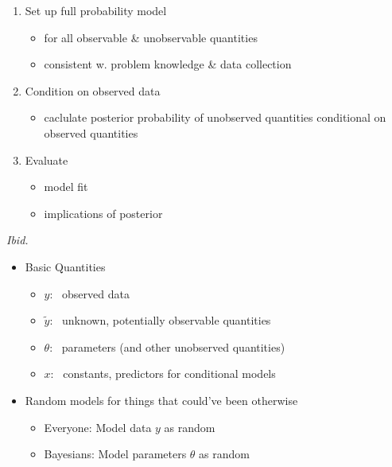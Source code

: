 \documentclass[10pt]{report}
\newcommand{\sld}[1]{\newpage{\noindent\LARGE \ \ \
    \textcolor{MidnightBlue}{\bfseries #1}}\vspace*{4pt}}
\begin{document}
\sld{Bayesian Mechanics}
% 
\begin{enumerate}
\item Set up full probability model 
  \vspace*{-4pt}
  \begin{itemize}
  \item for all observable \& unobservable quantities
  \item consistent w. problem knowledge \& data collection
  \end{itemize}
\item Condition on observed data
  \vspace*{-4pt}
  \begin{itemize}
  \item caclulate posterior probability of unobserved quantities
    conditional on observed quantities
  \end{itemize}
\item Evaluate 
  \vspace*{-4pt}
  \begin{itemize}
  \item model fit 
  \item implications of posterior
  \end{itemize}
\end{enumerate}

\vfill\hfill {\footnotesize {\slshape Ibid.}}

\sld{Basic Quantities}
% 
\begin{itemize}
\item Basic Quantities
  \vspace*{-4pt}
  \begin{itemize}
  \item $y$: \ observed data
  \item $\tilde{y}$: \ unknown, potentially observable quantities
  \item $\theta$: \ parameters (and other unobserved quantities)
  \item $x$: \ constants, predictors for conditional models
  \end{itemize}
\item Random models for things that could've been otherwise
  \begin{itemize}
  \item Everyone: Model data $y$ as random
  \item Bayesians:  Model parameters $\theta$ as random
  \end{itemize}
\end{itemize}
\end{document}
